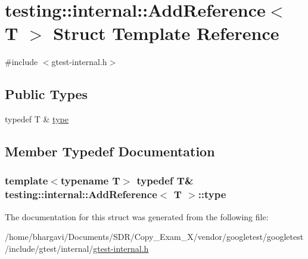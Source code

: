 \hypertarget{structtesting_1_1internal_1_1_add_reference}{}\section{testing\+:\+:internal\+:\+:Add\+Reference$<$ T $>$ Struct Template Reference}
\label{structtesting_1_1internal_1_1_add_reference}


{\ttfamily \#include $<$gtest-\/internal.\+h$>$}

\subsection*{Public Types}
\begin{DoxyCompactItemize}
\item 
typedef T \& \hyperlink{structtesting_1_1internal_1_1_add_reference_a2df8dd7c4e41f6390e6e66b1a9a67bb4}{type}
\end{DoxyCompactItemize}


\subsection{Member Typedef Documentation}
\subsubsection[{\texorpdfstring{type}{type}}]{\setlength{\rightskip}{0pt plus 5cm}template$<$typename T$>$ typedef T\& {\bf testing\+::internal\+::\+Add\+Reference}$<$ T $>$\+::{\bf type}}\hypertarget{structtesting_1_1internal_1_1_add_reference_a2df8dd7c4e41f6390e6e66b1a9a67bb4}{}\label{structtesting_1_1internal_1_1_add_reference_a2df8dd7c4e41f6390e6e66b1a9a67bb4}


The documentation for this struct was generated from the following file\+:\begin{DoxyCompactItemize}
\item 
/home/bhargavi/\+Documents/\+S\+D\+R/\+Copy\+\_\+\+Exam\+\_\+X/vendor/googletest/googletest/include/gtest/internal/\hyperlink{gtest-internal_8h}{gtest-\/internal.\+h}\end{DoxyCompactItemize}

